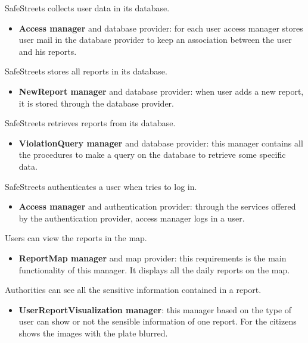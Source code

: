 \documentclass[../RASD.tex]{subfiles}
\begin{document}
\begin{enumerate}
         SafeStreets collects user data in its database.
        \begin{itemize}
            \item \textbf{Access manager} and database provider: for each user access manager stores user mail in the database provider to keep an association between the user and his reports.
        \end{itemize}

         SafeStreets stores all reports in its database.
        \begin{itemize}
            \item \textbf{NewReport manager} and database provider: when user adds a new report, it is stored through the database provider.
        \end{itemize}

         SafeStreets retrieves reports from its database.
        \begin{itemize}
            \item \textbf{ViolationQuery manager} and database provider: this manager contains all the procedures to make a query on the database to retrieve some specific data.
        \end{itemize}

         SafeStreets authenticates a user when tries to log in.
        \begin{itemize}
            \item \textbf{Access manager} and authentication provider: through the services offered by the authentication provider, access manager logs in a user.
        \end{itemize}

         Users can view the reports in the map.
        \begin{itemize}
            \item \textbf{ReportMap manager} and map provider: this requirements is the main functionality of this manager. It displays all the daily reports on the map.
        \end{itemize}


         Authorities can see all the sensitive information contained in a report.
        \begin{itemize}
            \item \textbf{UserReportVisualization manager}: this manager based on the type of user can show or not the sensible information of one report. For the citizens shows the images with the plate blurred.
        \end{itemize}


\end{enumerate}
\end{document}
